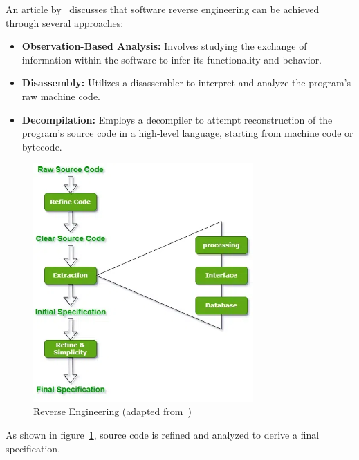 An article by~\citep{twoFacesOfSRE} discusses that software reverse engineering can be achieved through several approaches:
\begin{itemize}
    \item \textbf{Observation-Based Analysis:} Involves studying the exchange of information within the software to infer its functionality and behavior.
    \item \textbf{Disassembly:} Utilizes a disassembler to interpret and analyze the program's raw machine code.
    \item \textbf{Decompilation:} Employs a decompiler to attempt reconstruction of the program’s source code in a high-level language, starting from machine code or bytecode.
\end{itemize}

\begin{figure}[H]
    \centering
    \includegraphics[width=0.75\textwidth]{figures/Reverse-Engineering.png}
    \caption{Reverse Engineering (adapted from~\cite{geeksforgeeks2024})}
	\label{fig_background_reverse_engineering}
\end{figure}

As shown in figure~\ref{fig_background_reverse_engineering}, source code is refined and analyzed to derive a final specification.

